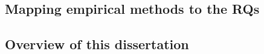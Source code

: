     


\subsection{Mapping empirical methods to the RQs}

\subsection{Overview of this dissertation}

